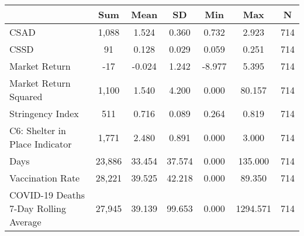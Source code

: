 {
\def\sym#1{\ifmmode^{#1}\else\(^{#1}\)\fi}
\begin{tabular}{l*{1}{cccccc}}
\toprule
                    &         Sum&        Mean&          SD&         Min&         Max&           N\\
\midrule
CSAD                &       1,088&       1.524&       0.360&       0.732&       2.923&         714\\
CSSD                &          91&       0.128&       0.029&       0.059&       0.251&         714\\
Market Return       &         -17&      -0.024&       1.242&      -8.977&       5.395&         714\\
Market Return Squared&       1,100&       1.540&       4.200&       0.000&      80.157&         714\\
Stringency Index    &         511&       0.716&       0.089&       0.264&       0.819&         714\\
C6: Shelter in Place Indicator&       1,771&       2.480&       0.891&       0.000&       3.000&         714\\
Days                &      23,886&      33.454&      37.574&       0.000&     135.000&         714\\
Vaccination Rate    &      28,221&      39.525&      42.218&       0.000&      89.350&         714\\
COVID-19 Deaths 7-Day Rolling Average&      27,945&      39.139&      99.653&       0.000&    1294.571&         714\\
\bottomrule
\end{tabular}
}

